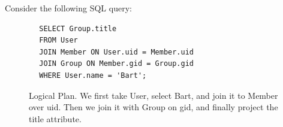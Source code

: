 \documentclass{article}
\begin{document}
    \begin{example}
      Consider the following SQL query:
      \begin{lstlisting}
        SELECT Group.title
        FROM User
        JOIN Member ON User.uid = Member.uid
        JOIN Group ON Member.gid = Group.gid
        WHERE User.name = 'Bart';
      \end{lstlisting}

      \begin{figure}[H]
        \centering 
        \caption{Logical Plan. We first take User, select Bart, and join it to Member over uid. Then we join it with Group on gid, and finally project the title attribute.} 
        \label{fig:logical_plan}
      \end{figure}


\end{example}
\end{document}

